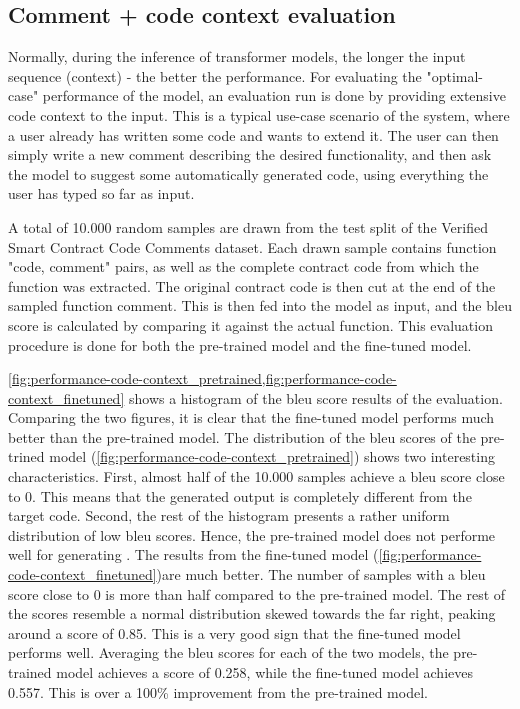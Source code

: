 \subsection{Comment + code context evaluation}
\label{sec:eval-rq1-comment-pluss-code-context}
Normally, during the inference of transformer models, the longer the input sequence (context) - the better the performance. For evaluating the "optimal-case" performance of the model, an evaluation run is done by providing extensive code context to the input. This is a typical use-case scenario of the system, where a user already has written some code and wants to extend it. The user can then simply write a new comment describing the desired functionality, and then ask the model to suggest some automatically generated code, using everything the user has typed so far as input.

A total of 10.000 random samples are drawn from the test split of the Verified Smart Contract Code Comments dataset. Each drawn sample contains function "code, comment" pairs, as well as the complete contract code from which the function was extracted. The original contract code is then cut at the end of the sampled function comment. This is then fed into the model as input, and the \gls{bleu} score is calculated by comparing it against the actual function. This evaluation procedure is done for both the pre-trained model and the fine-tuned model. 

\cref{fig:performance-code-context_pretrained,fig:performance-code-context_finetuned} shows a histogram of the \acrshort{bleu} score results of the evaluation. Comparing the two figures, it is clear that the fine-tuned model performs much better than the pre-trained model. The distribution of the \acrshort{bleu} scores of the pre-trined model (\cref{fig:performance-code-context_pretrained}) shows two interesting characteristics. First, almost half of the 10.000 samples achieve a \acrshort{bleu} score close to 0. This means that the generated output is completely different from the target code. Second, the rest of the histogram presents a rather uniform distribution of low \acrshort{bleu} scores. Hence, the pre-trained model does not performe well for generating . The results from the fine-tuned model (\cref{fig:performance-code-context_finetuned})are much better. The number of samples with a \acrshort{bleu} score close to 0 is more than half compared to the pre-trained model. The rest of the scores resemble a normal distribution skewed towards the far right, peaking around a score of 0.85. This is a very good sign that the fine-tuned model performs well. Averaging the \acrshort{bleu} scores for each of the two models, the pre-trained model achieves a score of 0.258, while the fine-tuned model achieves 0.557. This is over a 100\% improvement from the pre-trained model.

